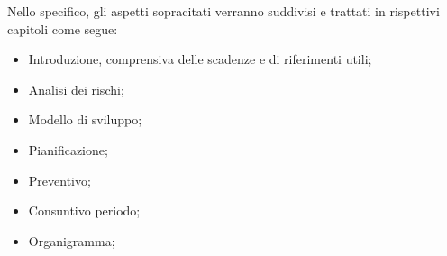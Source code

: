 Nello specifico, gli aspetti sopracitati verranno suddivisi e trattati in rispettivi capitoli come segue:
    \begin{itemize}
        \item Introduzione, comprensiva delle scadenze e di riferimenti utili;
        \item Analisi dei rischi;
        \item Modello di sviluppo;
        \item Pianificazione;
        \item Preventivo;
        \item Consuntivo periodo;
        \item Organigramma;
    \end{itemize}